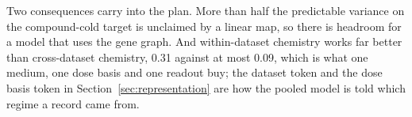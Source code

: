 \begin{table}[htbp]
\centering
\footnotesize
\caption{Linear and nearest-neighbor baselines on Vanacloig against the reliability ceiling,
medians over folds. For each split and target the best feature set per model class is shown.
Compound cold holds out one compound per fold; gene cold holds out a fifth of the genes per
fold and scores each compound column. The centered target removes each gene's training mean.}
\label{tab:baselines}

\end{table}

Two consequences carry into the plan. More than half the predictable variance on the
compound-cold target is unclaimed by a linear map, so there is headroom for a model that uses
the gene graph. And within-dataset chemistry works far better than cross-dataset chemistry,
0.31 against at most 0.09, which is what one medium, one dose basis and one readout buy; the
dataset token and the dose basis token in Section~\ref{sec:representation} are how the pooled
model is told which regime a record came from.
